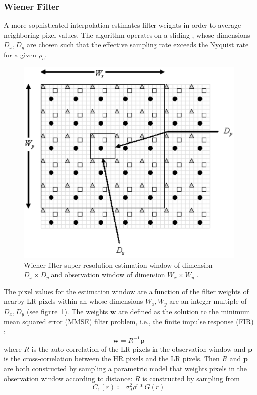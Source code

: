 \subsubsection{Wiener Filter}
A more sophisticated interpolation estimates filter weights \cite{wiener} in order to average neighboring pixel values.
%
The algorithm operates on a sliding , whose dimensions \(D_x, D_y\) are chosen such that the effective sampling rate exceeds the Nyquist rate for a given \(\rho_c\).
\begin{figure}[!htbp]
    \centering
    \includegraphics[width=.7\linewidth]{figures/classical/wiener.png}
    \caption{Wiener filter super resolution estimation window of dimension \(D_x \times D_y\) and observation window of dimension \(W_x \times W_y\) \cite{wiener}.}
    \label{fig:wiener}
\end{figure}
The pixel values for the estimation window are a function of the filter weights of nearby LR pixels within an  whose dimensions \(W_x, W_y\) are an integer multiple of \(D_x, D_y\) (see figure~\ref{fig:wiener}).
%
The weights \(\bm{w}\) are defined as the solution to the minimum mean squared error (MMSE) filter problem, i.e., the finite impulse response (FIR) :
\begin{equation}
    \bm{w} = R^{-1}\bm{p}
\end{equation}
where \(R\) is the auto-correlation of the LR pixels in the observation window and \(\bm{p}\) is the cross-correlation between the HR pixels and the LR pixels.
%
Then \(R\) and \(\bm{p}\) are both constructed by sampling a parametric model that weights pixels in the observation window according to distance:
%
\(R\) is constructed by sampling from
\begin{equation}
    C_1(r) \coloneqq \sigma_{d}^2 \rho^{r} \ast G(r)
\end{equation}
